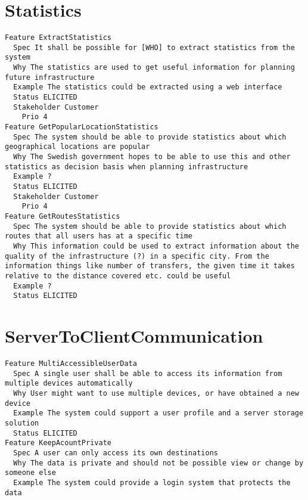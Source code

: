 \begin{lstlisting}

\end{lstlisting}


       \section{Statistics}


\begin{lstlisting}
Feature ExtractStatistics
  Spec It shall be possible for [WHO] to extract statistics from the system
  Why The statistics are used to get useful information for planning future infrastructure
  Example The statistics could be extracted using a web interface
  Status ELICITED
  Stakeholder Customer
    Prio 4
Feature GetPopularLocationStatistics
  Spec The system should be able to provide statistics about which geographical locations are popular
  Why The Swedish government hopes to be able to use this and other statistics as decision basis when planning infrastructure
  Example ?
  Status ELICITED
  Stakeholder Customer
    Prio 4
Feature GetRoutesStatistics
  Spec The system should be able to provide statistics about which routes that all users has at a specific time
  Why This information could be used to extract information about the quality of the infrastructure (?) in a specific city. From the information things like number of transfers, the given time it takes relative to the distance covered etc. could be useful
  Example ?
  Status ELICITED

\end{lstlisting}
    
        
       \section{ServerToClientCommunication}


\begin{lstlisting}
Feature MultiAccessibleUserData
  Spec A single user shall be able to access its information from multiple devices automatically
  Why User might want to use multiple devices, or have obtained a new device
  Example The system could support a user profile and a server storage solution
  Status ELICITED
Feature KeepAcountPrivate
  Spec A user can only access its own destinations
  Why The data is private and should not be possible view or change by someone else
  Example The system could provide a login system that protects the data

\end{lstlisting}
    
